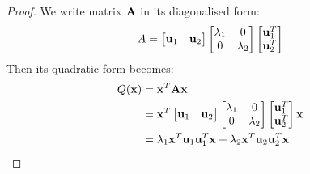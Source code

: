 \documentclass[a4paper]{article}
\numberwithin{equation}{section} %
\newcommand{\B}[1]{\textbf{\textup{#1}}} %
\begin{document}
\begin{proof} \cite{stackexellipse1}
	We write matrix $\B{A}$ in its diagonalised form:
	\begin{equation*}
      A=\begin{bmatrix}\B{u}_1 & \B{u}_{2}\end{bmatrix}
          \begin{bmatrix}\lambda_{1} & 0\\0 & \lambda_{2}\end{bmatrix}
          \begin{bmatrix}\B{u}_1^{T} \\ \B{u}_{2}^{T}\end{bmatrix}
     \end{equation*}
	Then its quadratic form becomes:
    \begin{equation*}
    	\begin{split}
    	Q(\B{x})&=\B{x}^{T}\B{Ax}\\
        		&=\B{x}^{T}\begin{bmatrix}\B{u}_1 & \B{u}_{2}\end{bmatrix}
          \begin{bmatrix}\lambda_{1} & 0\\0 & \lambda_{2}\end{bmatrix}
          \begin{bmatrix}\B{u}_1^{T} \\ \B{u}_{2}^{T}\end{bmatrix}\B{x}\\
          	&=\lambda_{1}\B{x}^{T}\B{u}_{1}\B{u}_{1}^{T}\B{x}+\lambda_{2}\B{x}^{T}\B{u}_{2}\B{u}_{2}^{T}\B{x}
        \end{split}
    \end{equation*}


\end{proof}
\end{document}
